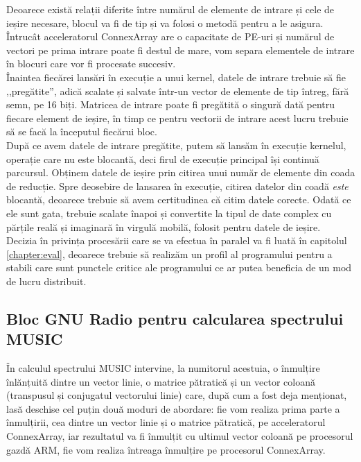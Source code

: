 Deoarece există relații diferite între numărul de elemente de intrare și cele de
ieșire necesare, blocul va fi de tip  și va folosi o metodă
 pentru a le asigura. Întrucât acceleratorul
ConnexArray are o capacitate de  PE-uri și
numărul de vectori pe prima intrare poate fi destul de mare, vom separa
elementele de intrare în blocuri care vor fi procesate succesiv. \\

Înaintea fiecărei lansări în execuție a unui kernel, datele de intrare trebuie
să fie ,,pregătite'', adică scalate și salvate într-un vector de elemente de tip
întreg, fără semn, pe 16 biți. Matricea de intrare poate fi pregătită o singură dată
pentru fiecare element de ieșire, în timp ce pentru vectorii de intrare acest
lucru trebuie să se facă la începutul fiecărui bloc. \\

După ce avem datele de intrare pregătite, putem să lansăm în execuție kernelul,
operație care nu este blocantă, deci firul de execuție principal își continuă
parcursul. Obținem datele de ieșire prin citirea unui număr de elemente din
coada de reducție. Spre deosebire de lansarea în execuție, citirea datelor din
coadă \textit{este} blocantă, deoarece trebuie să avem certitudinea că citim
datele corecte. Odată ce ele sunt gata, trebuie scalate înapoi și convertite la
tipul de date complex cu părțile reală și imaginară în virgulă mobilă, folosit
pentru datele de ieșire. \\

Decizia în privința procesării care se va efectua în paralel va fi luată în
capitolul \ref{chapter:eval}, deoarece trebuie să realizăm un profil al
programului pentru a stabili care sunt punctele critice ale programului ce ar
putea beneficia de un mod de lucru distribuit.

\subsection{Bloc GNU Radio pentru calcularea spectrului MUSIC}

În calculul spectrului MUSIC intervine, la numitorul acestuia, o înmulțire
înlănțuită dintre un vector linie, o matrice pătratică și un vector coloană
(transpusul și conjugatul vectorului linie) care, după cum a fost deja
menționat, lasă deschise cel puțin două moduri de abordare: fie vom realiza
prima parte a înmulțirii, cea dintre un vector linie și o matrice pătratică, pe
acceleratorul ConnexArray, iar rezultatul va fi înmulțit cu ultimul vector
coloană pe procesorul gazdă ARM, fie vom realiza întreaga înmulțire pe
procesorul ConnexArray. \\

